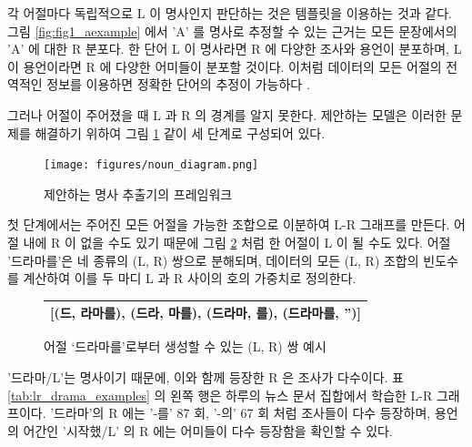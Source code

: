 \documentclass[11pt]{article}
\begin{document}
각 어절마다 독립적으로 L 이 명사인지 판단하는 것은 템플릿을 이용하는 것과 같다.
그림 \ref{fig:fig1_aexample} 에서 'A' 를 명사로 추정할 수 있는 근거는 모든 문장에서의 'A' 에 대한 R 분포다.
한 단어 L 이 명사라면 R 에 다양한 조사와 용언이 분포하며, L 이 용언이라면 R 에 다양한 어미들이 분포할 것이다.
이처럼 데이터의 모든 어절의 전역적인 정보를 이용하면 정확한 단어의 추정이 가능하다 \citep{zhao2007incorporating}.

그러나 어절이 주어졌을 때 L 과 R 의 경계를 알지 못한다.
제안하는 모델은 이러한 문제를 해결하기 위하여 그림 \ref{fig:noun_diagram} 같이 세 단계로 구성되어 있다.

\begin{figure}[ht]
\centering
\texttt{[image: figures/noun\_diagram.png]}
\label{fig:noun_diagram}
\caption{제안하는 명사 추출기의 프레임워크}
\end{figure}

첫 단계에서는 주어진 모든 어절을 가능한 조합으로 이분하여 L-R 그래프를 만든다.
어절 내에 R 이 없을 수도 있기 때문에 그림 \ref{fig:four_lrcandidates} 처럼 한 어절이 L 이 될 수도 있다.
어절 '드라마를'은 네 종류의 (L, R) 쌍으로 분해되며, 데이터의 모든 (L, R) 조합의 빈도수를 계산하여 이를 두 마디 L 과 R 사이의 호의 가중치로 정의한다.

\begin{figure}[H]
\small
\centering
\caption{어절 ‘드라마를’로부터 생성할 수 있는 (L, R) 쌍 예시}
\label{fig:four_lrcandidates}
\begin{tabular}{|c|}
\hline
{[}(드, 라마를), (드라, 마를), (드라마, 를), (드라마를, ''){]} \\ \hline
\end{tabular}%
\end{figure}

'드라마/L'는 명사이기 때문에, 이와 함께 등장한 R 은 조사가 다수이다.
표 \ref{tab:lr_drama_examples} 의 왼쪽 행은 하루의 뉴스 문서 집합에서 학습한 L-R 그래프이다.
'드라마'의 R 에는 '-를' 87 회, '-의' 67 회 처럼 조사들이 다수 등장하며, 용언의 어간인 '시작했/L' 의 R 에는 어미들이 다수 등장함을 확인할 수 있다.
\end{document}
